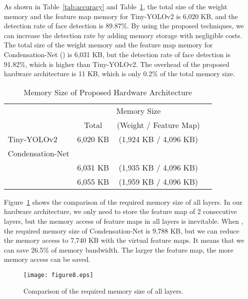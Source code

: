 \documentclass[10pt,twocolumn,letterpaper]{article}
\begin{document}
As shown in Table~\ref{tab:accuracy} and Table~\ref{tab:size}, the total size of the weight memory and the feature map memory for Tiny-YOLOv2 is 6,020 KB, and the detection rate of face detection is 89.87\%. By using the proposed techniques, we can increase the detection rate by adding memory storage with negligible costs. The total size of the weight memory and the feature map memory for Condensation-Net () is 6,031 KB, but the detection rate of face detection is 91.82\%, which is higher than Tiny-YOLOv2. The overhead of the proposed hardware architecture is 11 KB, which is only 0.2\% of the total memory size.

\begin{table}
\begin{center}
\begin{tabular}{l|ccc}
\hline
           & \multicolumn{2}{c}{Memory Size}\\  
           & Total & (Weight / Feature Map)\\
\hline\hline
Tiny-YOLOv2                        &  6,020 KB & (1,924 KB / 4,096 KB) \\
\hline
Condensation-Net\\
                     &  6,031 KB & (1,935 KB / 4,096 KB) \\
                     &  6,055 KB & (1,959 KB / 4,096 KB) \\
\hline
\end{tabular}
\end{center}
\caption{Memory Size of Proposed Hardware Architecture}
\label{tab:size}
\end{table}

Figure~\ref{fig:bandwidth} shows the comparison of the required memory size of all layers. In our hardware architecture, we only need to store the feature map of 2 consecutive layers, but the memory access of feature maps in all layers is inevitable. When , the required memory size of Condensation-Net is 9,788 KB, but we can reduce the memory access to 7,740 KB with the virtual feature maps. It means that we can save 26.5\% of memory bandwidth. The larger the feature map, the more memory access can be saved.

\begin{figure}[t]
\begin{center}
\texttt{[image: figure8.eps]}
\end{center}
   \caption{Comparison of the required memory size of all layers.}
\label{fig:bandwidth}
\end{figure}
\end{document}
